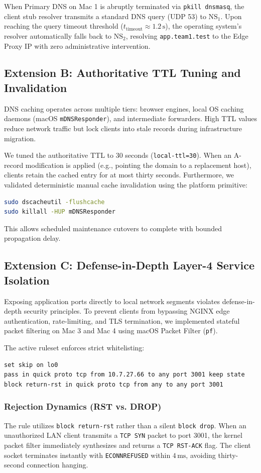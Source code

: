 \documentclass[conference]{IEEEtran}
\begin{document}
When Primary DNS on Mac 1 is abruptly terminated via \texttt{pkill dnsmasq}, the client stub resolver transmits a standard DNS query (UDP 53) to $\text{NS}_1$. Upon reaching the query timeout threshold ($t_{\text{timeout}} \approx 1.2\,\text{s}$), the operating system's resolver automatically falls back to $\text{NS}_2$, resolving \texttt{app.team1.test} to the Edge Proxy IP with zero administrative intervention.

\subsection{Extension B: Authoritative TTL Tuning and Invalidation}
DNS caching operates across multiple tiers: browser engines, local OS caching daemons (macOS \texttt{mDNSResponder}), and intermediate forwarders. High TTL values reduce network traffic but lock clients into stale records during infrastructure migration.

We tuned the authoritative TTL to 30 seconds (\texttt{local-ttl=30}). When an A-record modification is applied (e.g., pointing the domain to a replacement host), clients retain the cached entry for at most thirty seconds. Furthermore, we validated deterministic manual cache invalidation using the platform primitive:
\begin{lstlisting}[language=bash]
sudo dscacheutil -flushcache
sudo killall -HUP mDNSResponder
\end{lstlisting}
This allows scheduled maintenance cutovers to complete with bounded propagation delay.

\subsection{Extension C: Defense-in-Depth Layer-4 Service Isolation}
Exposing application ports directly to local network segments violates defense-in-depth security principles. To prevent clients from bypassing NGINX edge authentication, rate-limiting, and TLS termination, we implemented stateful packet filtering on Mac 3 and Mac 4 using macOS Packet Filter (\texttt{pf}).

The active ruleset enforces strict whitelisting:
\begin{lstlisting}
set skip on lo0
pass in quick proto tcp from 10.7.27.66 to any port 3001 keep state
block return-rst in quick proto tcp from any to any port 3001
\end{lstlisting}

\subsubsection{Rejection Dynamics (RST vs. DROP)}
The rule utilizes \texttt{block return-rst} rather than a silent \texttt{block drop}. When an unauthorized LAN client transmits a \texttt{TCP SYN} packet to port 3001, the kernel packet filter immediately synthesizes and returns a \texttt{TCP RST-ACK} flag. The client socket terminates instantly with \texttt{ECONNREFUSED} within $4\,\text{ms}$, avoiding thirty-second connection hanging.
\end{document}
